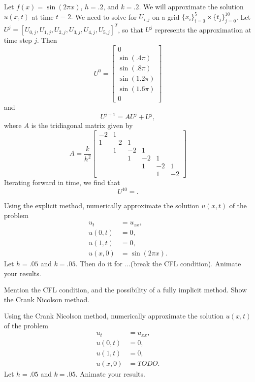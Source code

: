 Let $f(x) = \sin(2\pi x)$, $h = .2$, and $k=.2$. We will approximate the solution $u(x,t)$ at time $t = 2.$ We need to solve for $U_{i,j}$ on a grid $\{x_i\}_{i=0}^5 \times \{t_j\}_{j=0}^{10}$. Let $U^j = [U_{0,j}, U_{1,j}, U_{2,j}, U_{3,j}, U_{4,j},  U_{5,j}]^T$, so that $U^j$ represents the approximation at time step $j$.
Then 
\[
U^0 = 
\left[\begin{array}{c} 0 \\\sin(.4 \pi) \\\sin(.8 \pi) \\\sin(1.2 \pi) \\\sin(1.6 \pi) \\ 0 \end{array}\right]
\]
and 
\[
U^{j+1} = A U^j + U^j,
\]
where $A$ is the tridiagonal matrix given by 
\[
A = \frac{k}{h^2} \left[\begin{array}{cccccc}-2 & 1 &  &  &  &  \\1 & -2 & 1 &  &  &  \\ & 1 & -2 & 1 &  &  \\ &  & 1 & -2 & 1 &  \\ &  &  & 1 & -2 & 1 \\ &  &  &  & 1 & -2\end{array}\right]
\]
Iterating forward in time, we find that 
\[
U^{10} = .
\]

\begin{problem}
	Using the explicit method, numerically approximate the solution $u(x,t)$ of the problem 
	\begin{align*}
		u_t &= u_{xx},\\
		u(0,t) &= 0,\\
		u(1,t) &= 0,\\
		u(x,0) &= \sin(2 \pi x).
	\end{align*}
	Let $h = .05$ and $k= .05$. Then do it for ...(break the CFL condition).
	Animate your results. 
\end{problem}
Mention the CFL condition, and the possibility of a fully implicit method. 
Show the Crank Nicolson method. 


\begin{problem}
	Using the Crank Nicolson method, numerically approximate the solution $u(x,t)$ of the problem 
	\begin{align*}
		u_t &= u_{xx},\\
		u(0,t) &= 0,\\
		u(1,t) &= 0,\\
		u(x,0) &= TODO.
	\end{align*}
	Let $h = .05$ and $k= .05$. 
	Animate your results. 
\end{problem}

